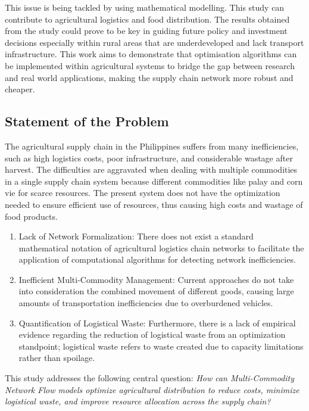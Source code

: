 \documentclass{icsthesis}
\begin{document}
\begin{mainmatter}
This issue is being tackled by using mathematical modelling. This study can contribute to agricultural logistics and food distribution. The results obtained from the study could prove to be key in guiding future policy and investment decisions especially within rural areas that are underdeveloped and lack transport infrastructure. This work aims to demonstrate that optimisation algorithms can be implemented within agricultural systems to bridge the gap between research and real world applications, making the supply chain network more robust and cheaper.

\subsection{Statement of the Problem}
The agricultural supply chain in the Philippines suffers from many inefficiencies, such as high logistics costs, poor infrastructure, and considerable wastage after harvest. The difficulties are aggravated when dealing with multiple commodities in a single supply chain system because different commodities like palay and corn vie for scarce resources. The present system does not have the optimization needed to ensure efficient use of resources, thus causing high costs and wastage of food products.

\begin{enumerate}
    \item Lack of Network Formalization: There does not exist a standard mathematical notation of agricultural logistics chain networks to facilitate the application of computational algorithms for detecting network inefficiencies.
    \item  Inefficient Multi-Commodity Management: Current approaches do not take into consideration the combined movement of different goods, causing large amounts of transportation inefficiencies due to overburdened vehicles.
    \item Quantification of Logistical Waste: Furthermore, there is a lack of empirical evidence regarding the reduction of logistical waste from an optimization standpoint; logistical waste refers to waste created due to capacity limitations rather than spoilage.
\end{enumerate}

This study addresses the following central question: \textit{How can Multi-Commodity Network Flow models optimize agricultural distribution to reduce costs, minimize logistical waste, and improve resource allocation across the supply chain?}



\end{mainmatter}
\end{document}
